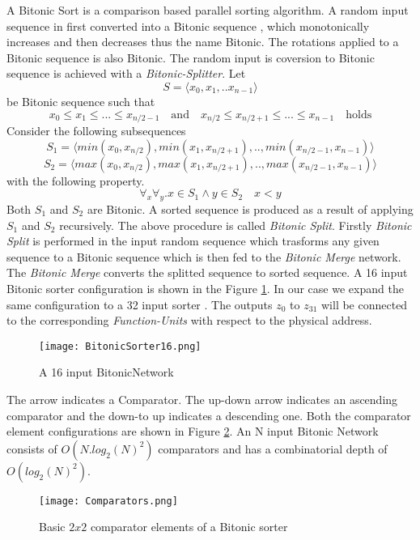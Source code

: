 			    A Bitonic Sort\cite{bitonic_ref} is a comparison based parallel sorting algorithm. A random input sequence in first converted into a Bitonic sequence , which monotonically increases and then decreases thus the name Bitonic.
			    The rotations applied to a Bitonic sequence is also Bitonic. The random input is coversion to Bitonic sequence is achieved with a \textit{Bitonic-Splitter}.\newline
			    Let \[ 
				  S = \langle x_0,x_1,..x_{n-1}\rangle 
				\] be Bitonic sequence such that
				\[
				    x_0 \leq x_1 \leq ... \leq x_{n/2-1} \quad \textrm{and} \quad  x_{n/2} \leq x_{n/2+1} \leq ... \leq x_{n-1}  \quad \textrm{holds}
				\]
			    Consider the following subsequences
				\[
				  S_{1} =  \langle min(x_0,x_{n/2}), min(x_1,x_{n/2+1}),..,min(x_{n/2-1},x_{n-1})\rangle
				\]
				\[
				  S_{2} =  \langle max(x_0,x_{n/2}), max(x_1,x_{n/2+1}),..,max(x_{n/2-1},x_{n-1})\rangle
				\]
			    with the following property.
				\[
				  \forall _{x} \forall _{y}. x \in S_{1}  \wedge  y \in S_{2} \quad x < y
				\]
			    Both $S_{1}$ and $S_{2}$ are Bitonic. A sorted sequence is produced as a result of applying $S_{1}$ and $S_{2}$ recursively. The above procedure is called \textit{Bitonic Split}. Firstly \textit{Bitonic Split} is performed 
			    in the input random sequence which trasforms any given sequence to a Bitonic sequence which is then fed to the \textit{Bitonic Merge} network. The \textit{Bitonic Merge} converts the splitted sequence to sorted sequence. A 16 input Bitonic sorter configuration is shown in the Figure \ref{fig:BitonicSorter16}. In our case we expand the same configuration to a 32 input sorter . The outputs $z_{0}$ to $z_{31}$  will
			    be connected to the corresponding \textit{Function-Units} with respect to the physical address.
				    \begin{figure}[!ht]
					      \texttt{[image: BitonicSorter16.png]}
					    \caption{A 16 input BitonicNetwork}
				    \label{fig:BitonicSorter16}
				    \end{figure}
			    The arrow indicates a Comparator. The up-down arrow indicates an ascending comparator and the down-to up indicates a descending one. Both the comparator element configurations are shown in Figure \ref{fig:Comparators}. 
			    An N input Bitonic Network consists of $O(N.log_{2}(N)^{2})$ comparators and has a combinatorial depth of $O(log_{2}(N)^{2})$.
				    \begin{figure}[!ht]
					      \texttt{[image: Comparators.png]}
					    \caption{Basic $2 x 2$ comparator elements of a Bitonic sorter}
				    \label{fig:Comparators}
				    \end{figure}
